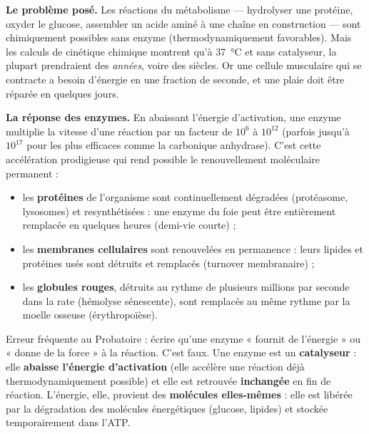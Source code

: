\documentclass[11pt]{article}
\newcommand{\cle}[1]{{\popxbold\color{popdark}#1}}
\begin{document}
\textbf{Le problème posé.} Les réactions du métabolisme — hydrolyser une protéine, oxyder le glucose, assembler un acide aminé à une chaîne en construction — sont chimiquement possibles sans enzyme (thermodynamiquement favorables). Mais les calculs de cinétique chimique montrent qu'à 37~°C et sans catalyseur, la plupart prendraient des \emph{années}, voire des siècles. Or une cellule musculaire qui se contracte a besoin d'énergie en une fraction de seconde, et une plaie doit être réparée en quelques jours.

\textbf{La réponse des enzymes.} En abaissant l'énergie d'activation, une enzyme multiplie la vitesse d'une réaction par un facteur de $10^{6}$ à $10^{12}$ (parfois jusqu'à $10^{17}$ pour les plus efficaces comme la carbonique anhydrase). C'est cette accélération prodigieuse qui rend possible le \cle{renouvellement moléculaire permanent} :
\begin{itemize}
\item les \textbf{protéines} de l'organisme sont continuellement dégradées (protéasome, lysosomes) et resynthétisées : une enzyme du foie peut être entièrement remplacée en quelques heures (demi-vie courte) ;
\item les \textbf{membranes cellulaires} sont renouvelées en permanence : leurs lipides et protéines usés sont détruits et remplacés (turnover membranaire) ;
\item les \textbf{globules rouges}, détruits au rythme de plusieurs millions par seconde dans la rate (hémolyse sénescente), sont remplacés au même rythme par la moelle osseuse (érythropoïèse).
\end{itemize}

\begin{attention}
Erreur fréquente au Probatoire : écrire qu'une enzyme « fournit de l'énergie » ou « donne de la force » à la réaction. C'est faux. Une enzyme est un \textbf{catalyseur} : elle \textbf{abaisse l'énergie d'activation} (elle accélère une réaction déjà thermodynamiquement possible) et elle est retrouvée \textbf{inchangée} en fin de réaction. L'énergie, elle, provient des \textbf{molécules elles-mêmes} : elle est libérée par la dégradation des molécules énergétiques (glucose, lipides) et stockée temporairement dans l'ATP.
\end{attention}
\end{document}
